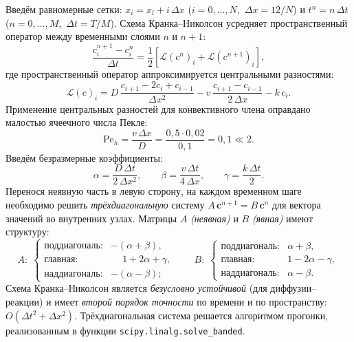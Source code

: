         Введём равномерные сетки: $x_i = x_l + i\,\Delta x$
        ($i = 0, \ldots, N$,\ $\Delta x = 12/N$)
        и $t^n = n\,\Delta t$ ($n = 0, \ldots, M$,\ $\Delta t = T/M$).
        Схема Кранка--Николсон усредняет пространственный оператор между
        временными слоями $n$ и $n+1$:
        \[
            \frac{c_i^{n+1} - c_i^n}{\Delta t}
            = \frac{1}{2}\left[\mathcal{L}(c^n)_i
                              + \mathcal{L}(c^{n+1})_i\right],
        \]
        где пространственный оператор аппроксимируется центральными разностями:
        \[
            \mathcal{L}(c)_i
            = D\,\frac{c_{i+1} - 2c_i + c_{i-1}}{\Delta x^2}
            - v\,\frac{c_{i+1} - c_{i-1}}{2\,\Delta x}
            - k\,c_i.
        \]
        Применение центральных разностей для конвективного члена оправдано
        малостью ячеечного числа Пекле:
        \[
            \mathrm{Pe}_h
            = \frac{v\,\Delta x}{D}
            = \frac{0{,}5 \cdot 0{,}02}{0{,}1}
            = 0{,}1 \ll 2.
        \]
        Введём безразмерные коэффициенты:
        \[
            \alpha = \frac{D\,\Delta t}{2\,\Delta x^2}, \qquad
            \beta  = \frac{v\,\Delta t}{4\,\Delta x},   \qquad
            \gamma = \frac{k\,\Delta t}{2}.
        \]
        Перенося неявную часть в левую сторону, на каждом временном шаге
        необходимо решить \textit{трёхдиагональную} систему
        $A\,\mathbf{c}^{n+1} = B\,\mathbf{c}^n$
        для вектора значений во внутренних узлах.
        Матрицы $A$ \textit{(неявная)} и $B$ \textit{(явная)} имеют структуру:
        \[
            A:\;
            \begin{cases}
                \text{поддиагональ:} & -(\alpha+\beta), \\
                \text{главная:}      & \phantom{-}1 + 2\alpha + \gamma, \\
                \text{наддиагональ:} & -(\alpha-\beta);
            \end{cases}
            \qquad
            B:\;
            \begin{cases}
                \text{поддиагональ:} & \alpha+\beta, \\
                \text{главная:}      & 1 - 2\alpha - \gamma, \\
                \text{наддиагональ:} & \alpha-\beta.
            \end{cases}
        \]
        Схема Кранка--Николсон является \textit{безусловно устойчивой} (для
        диффузии--реакции) и имеет \textit{второй порядок точности} по времени
        и по пространству: $O(\Delta t^2 + \Delta x^2)$.
        Трёхдиагональная система решается алгоритмом прогонки,
        реализованным в функции \texttt{scipy.linalg.solve\_banded}.

